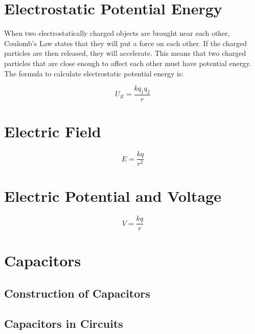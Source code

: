 	
	
	
	
	
	\section{Electrostatic Potential Energy}
	
	When two electrostatically charged objects are brought near each other, Coulomb's Law states that they will put a force on each other.  If the charged particles are then released, they will accelerate.  This means that two charged particles that are close enough to affect each other must have potential energy.  The formula to calculate electrostatic potential energy is:
	
	
	\begin{mdframed}[backgroundcolor=orange!20!white]
		
		\begin{equation}
		U_E = \frac{kq_1q_2}{r}
		\label{equation:electrostaticpotentialenergy}
		\end{equation}
	\end{mdframed}	
	
	
	
	
	\section{Electric Field}  
	
		\begin{mdframed}[backgroundcolor=orange!20!white]
		
		\begin{equation}
		{E} = \frac{kq}{r^2}
		\label{equation:electrostaticfield}
		\end{equation}
	\end{mdframed}	
	
	
	
	\section{Electric Potential and Voltage}
	
		\begin{mdframed}[backgroundcolor=orange!20!white]
	
	\begin{equation}
	V = \frac{kq}{r}
	\label{equation:electrostaticpotential}
	\end{equation}
\end{mdframed}	
	
	\section{Capacitors}
		\subsection{Construction of Capacitors}
		\subsection{Capacitors in Circuits}
		
	
	
	

	


